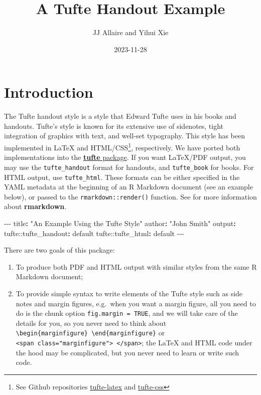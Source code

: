 \documentclass[]{tufte-handout}
\title[Tufte Handout with R Markdown]{A Tufte Handout Example}
\author{JJ Allaire and Yihui Xie}
\date{2023-11-28}
\newenvironment{Shaded}{}{}
\newcommand{\AttributeTok}[1]{\textcolor[rgb]{0.49,0.56,0.16}{#1}}
\newcommand{\FunctionTok}[1]{\textcolor[rgb]{0.02,0.16,0.49}{#1}}
\newcommand{\KeywordTok}[1]{\textcolor[rgb]{0.00,0.44,0.13}{\textbf{#1}}}
\newcommand{\PreprocessorTok}[1]{\textcolor[rgb]{0.74,0.48,0.00}{#1}}
\newcommand{\StringTok}[1]{\textcolor[rgb]{0.25,0.44,0.63}{#1}}
\providecommand{\tightlist}{%
  \setlength{\itemsep}{0pt}\setlength{\parskip}{0pt}}
\begin{document}
\maketitle




\hypertarget{introduction}{%
\section{Introduction}\label{introduction}}

The Tufte handout style is a style that Edward Tufte uses in his books
and handouts. Tufte's style is known for its extensive use of sidenotes,
tight integration of graphics with text, and well-set typography. This
style has been implemented in LaTeX and HTML/CSS\footnote{See Github
  repositories
  \href{https://github.com/tufte-latex/tufte-latex}{tufte-latex} and
  \href{https://github.com/edwardtufte/tufte-css}{tufte-css}},
respectively. We have ported both implementations into the
\href{https://github.com/rstudio/tufte}{\textbf{tufte} package}. If you
want LaTeX/PDF output, you may use the \texttt{tufte\_handout} format
for handouts, and \texttt{tufte\_book} for books. For HTML output, use
\texttt{tufte\_html}. These formats can be either specified in the YAML
metadata at the beginning of an R Markdown document (see an example
below), or passed to the \texttt{rmarkdown::render()} function. See
\citet{R-rmarkdown} for more information about \textbf{rmarkdown}.

\begin{Shaded}
\begin{Highlighting}[]
\PreprocessorTok{{-}{-}{-}}
\FunctionTok{title}\KeywordTok{:}\AttributeTok{ }\StringTok{"An Example Using the Tufte Style"}
\FunctionTok{author}\KeywordTok{:}\AttributeTok{ }\StringTok{"John Smith"}
\FunctionTok{output}\KeywordTok{:}
\AttributeTok{  tufte:}\FunctionTok{:tufte\_handout}\KeywordTok{:}\AttributeTok{ default}
\AttributeTok{  tufte:}\FunctionTok{:tufte\_html}\KeywordTok{:}\AttributeTok{ default}
\PreprocessorTok{{-}{-}{-}}
\end{Highlighting}
\end{Shaded}

There are two goals of this package:

\begin{enumerate}
\def\labelenumi{\arabic{enumi}.}
\tightlist
\item
  To produce both PDF and HTML output with similar styles from the same
  R Markdown document;
\item
  To provide simple syntax to write elements of the Tufte style such as
  side notes and margin figures, e.g.~when you want a margin figure, all
  you need to do is the chunk option \texttt{fig.margin\ =\ TRUE}, and
  we will take care of the details for you, so you never need to think
  about
  \texttt{\textbackslash{}begin\{marginfigure\}\ \textbackslash{}end\{marginfigure\}}
  or
  \texttt{\textless{}span\ class="marginfigure"\textgreater{}\ \textless{}/span\textgreater{}};
  the LaTeX and HTML code under the hood may be complicated, but you
  never need to learn or write such code.
\end{enumerate}
\end{document}
